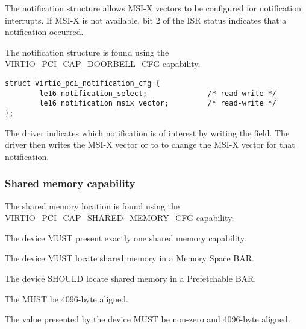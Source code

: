 The notification structure allows MSI-X vectors to be configured for
notification interrupts.  If MSI-X is not available, bit 2 of the ISR status
indicates that a notification occurred.

The notification structure is found using the VIRTIO_PCI_CAP_DOORBELL_CFG
capability.

\begin{lstlisting}
struct virtio_pci_notification_cfg {
        le16 notification_select;              /* read-write */
        le16 notification_msix_vector;         /* read-write */
};
\end{lstlisting}

The driver indicates which notification is of interest by writing the
 field.  The driver then writes the MSI-X vector or
 to  to change the
MSI-X vector for that notification.

\subsubsection{Shared memory capability}\label{sec:Device Types / Vhost-user Device Backend / Additional Device Resources over PCI / Shared Memory capability}

The shared memory location is found using the VIRTIO_PCI_CAP_SHARED_MEMORY_CFG
capability.

The device MUST present exactly one shared memory capability.

The device MUST locate shared memory in a Memory Space BAR.

The device SHOULD locate shared memory in a Prefetchable BAR.

The  MUST be 4096-byte aligned.

The value  presented by the device MUST be non-zero and 4096-byte aligned.
